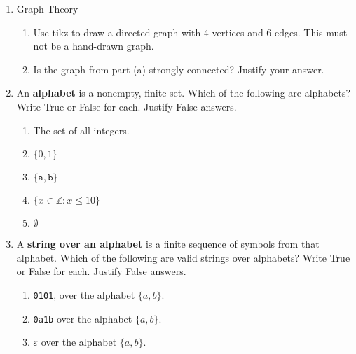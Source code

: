 \documentclass[12pt]{article}
\begin{document}
\begin{enumerate}[itemsep=1em]
\newpage

\item{Graph Theory}
\begin{enumerate}
    \item Use tikz to draw a directed graph with 4 vertices and 6 edges. This must not be a hand-drawn graph.
    \item Is the graph from part (a) strongly connected? Justify your answer.
\end{enumerate}


\item{An \textbf{alphabet} is a nonempty, finite set. Which of the following are alphabets? Write True or False for each. Justify False answers.}
\begin{enumerate}
    \item{The set of all integers.}
    \item{$\{0, 1\}$}
    \item{$\{\texttt{a}, \texttt{b}\}$}
    \item{$\{x \in \mathbb{Z} : x \le 10\}$}
    \item{$\emptyset$}
\end{enumerate}
\item{A \textbf{string over an alphabet} is a finite sequence of symbols from that alphabet. Which of the following are valid strings over alphabets? Write True or False for each. Justify False answers.}
\begin{enumerate}
    \item{\texttt{0101}, over the alphabet $\{a,b\}$.}
    \item{\texttt{0a1b} over the alphabet $\{a,b\}$.}
    \item{$\varepsilon$ over the alphabet $\{a,b\}$.}
\end{enumerate}


\end{enumerate}
\end{document}
